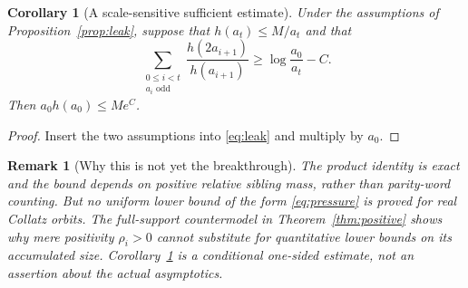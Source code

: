 \documentclass[11pt,a4paper]{article}
\newtheorem{corollary}[theorem]{Corollary}
\newtheorem{remark}[theorem]{Remark}
\begin{document}
\begin{corollary}[A scale-sensitive sufficient estimate]
\label{cor:scale}
Under the assumptions of Proposition~\ref{prop:leak}, suppose
that $h(a_t)\le M/a_t$ and that
\begin{equation}\label{eq:pressure}
 \sum_{\substack{0\le i<t\\a_i\text{ odd}}}
 \frac{h(2a_{i+1})}{h(a_{i+1})}
 \ge \log\frac{a_0}{a_t}-C.
\end{equation}
Then $a_0h(a_0)\le M e^C$.
\end{corollary}
\begin{proof}
Insert the two assumptions into \eqref{eq:leak} and multiply
by $a_0$.
\end{proof}
\begin{remark}[Why this is not yet the breakthrough]
The product identity is exact and the bound depends on positive
\emph{relative sibling mass}, rather than parity-word counting.
But no uniform lower bound of the form \eqref{eq:pressure} is proved
for real Collatz orbits. The full-support countermodel in
Theorem~\ref{thm:positive} shows why mere positivity
$\rho_i>0$ cannot substitute for quantitative lower bounds on
its accumulated size. Corollary~\ref{cor:scale} is a conditional
one-sided estimate, not an assertion about the actual asymptotics.
\end{remark}
\end{document}
